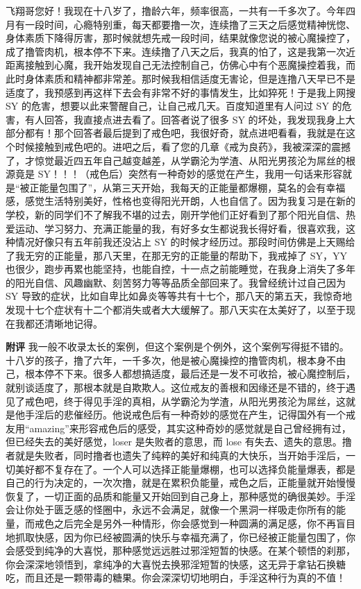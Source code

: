 \begin{case}
    飞翔哥您好！我现在十八岁了，撸龄六年，频率很高，一共有一千多次了。今年四月有一段时间，心瘾特别重，每天都要撸一次，连续撸了三天之后感觉精神恍惚、身体素质下降得厉害，那时候就想先戒一段时间，结果就像您说的被心魔操控了，成了撸管肉机，根本停不下来。连续撸了八天之后，我真的怕了，这是我第一次近距离接触到心魔，我开始发现自己无法控制自己，仿佛心中有个恶魔操控着我，而此时身体素质和精神都非常差。那时候我相信适度无害论，但是连撸八天早已不是适度了，我预感到再这样下去会有非常不好的事情发生，比如猝死！于是我上网搜 SY 的危害，想要以此来警醒自己，让自己戒几天。百度知道里有人问过 SY 的危害，有人回答，我直接点进去看了。回答者说了很多 SY 的坏处，我发现我身上大部分都有！那个回答者最后提到了戒色吧，我很好奇，就点进吧看看，我就是在这个时候接触到戒色吧的。进吧之后，看了您的几章《戒为良药》，我被深深的震撼了，才惊觉最近四五年自己越变越差，从学霸沦为学渣、从阳光男孩沦为屌丝的根源竟是 SY！！！（戒色后）突然有一种奇妙的感觉在产生，我用一句话来形容就是“被正能量包围了”，从第三天开始，我每天的正能量都爆棚，莫名的会有幸福感，感觉生活特别美好，性格也变得阳光开朗，人也自信了。因为我复习是在新的学校，新的同学们不了解我不堪的过去，刚开学他们正好看到了那个阳光自信、热爱运动、学习努力、充满正能量的我，有好多女生都说我长得好看，很喜欢我，这种情况好像只有五年前我还没沾上 SY 的时候才经历过。那段时间仿佛是上天赐给了我无穷的正能量，那八天里，在那无穷的正能量的帮助下，我戒掉了 SY，YY 也很少，跑步再累也能坚持，也能自控，十一点之前能睡觉，在我身上消失了多年的阳光自信、风趣幽默、刻苦努力等等品质全部回来了。我曾经统计过自己因为 SY 导致的症状，比如自卑比如鼻炎等等共有十七个，那八天的第五天，我惊奇地发现十七个症状有十二个都消失或者大大缓解了。那八天实在太美好了，以至于现在我都还清晰地记得。

    \textbf{附评} 我一般不收录太长的案例，但这个案例是个例外，这个案例写得挺不错的。十八岁的孩子，撸了六年，一千多次，他是被心魔操控的撸管肉机，根本身不由己，根本停不下来。很多人都想搞适度，最后还是一发不可收拾，被心魔控制后，就别谈适度了，那根本就是自欺欺人。这位戒友的善根和因缘还是不错的，终于遇见了戒色吧，终于得见手淫的真相，从学霸沦为学渣，从阳光男孩沦为屌丝，这就是他手淫后的悲催经历。他说戒色后有一种奇妙的感觉在产生，记得国外有一个戒友用“amazing”来形容戒色后的感受，其实这种奇妙的感觉就是自己曾经拥有过，但已经失去的美好感觉，loser 是失败者的意思，而 lose 有失去、遗失的意思。撸者就是失败者，同时撸者也遗失了纯粹的美好和纯真的大快乐，当开始手淫后，一切美好都不复存在了。一个人可以选择正能量爆棚，也可以选择负能量爆表，都是自己的行为决定的，一次次撸，就是在累积负能量，戒色之后，正能量就开始慢慢恢复了，一切正面的品质和能量又开始回到自己身上，那种感觉的确很美妙。手淫会让你处于匮乏感的怪圈中，永远不会满足，就像一个黑洞一样吸走你所有的能量，而戒色之后完全是另外一种情形，你会感觉到一种圆满的满足感，你不再盲目地抓取快感，因为你已经被圆满的快乐与幸福充满了，你已经被正能量包围了，你会感受到纯净的大喜悦，那种感觉远远胜过邪淫短暂的快感。在某个顿悟的刹那，你会深深地领悟到，拿纯净的大喜悦去换邪淫短暂的快感，这无异于拿钻石换糖吃，而且还是一颗带毒的糖果。你会深深切切地明白，手淫这种行为真的不值！


\end{case}
